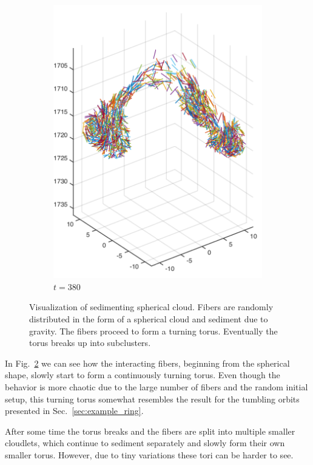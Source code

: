 \begin{figure}[htbp]
\begin{subfigure}[h]{0.45\textwidth}
    \includegraphics[width=\textwidth]{img/state_00380.pdf}
    \caption{$t=380$}\label{fig:sphere_simulation_1d}
  \end{subfigure}
  \caption[Visualization of sedimenting spherical cloud.]{Visualization of sedimenting spherical cloud. Fibers are randomly distributed in the form of a spherical cloud and sediment due to gravity. The fibers proceed to form a turning torus. Eventually the torus breaks up into subclusters.}
  \label{fig:sphere_simulation}
\end{figure}

In Fig.~\ref{fig:sphere_simulation} we can see how the interacting fibers, beginning from the spherical shape, slowly start to form a continuously turning torus. Even though the behavior is more chaotic due to the large number of fibers and the random initial setup, this turning torus somewhat resembles the result for the tumbling orbits presented in Sec.~\ref{sec:example_ring}.

After some time the torus breaks and the fibers are split into multiple smaller cloudlets, which continue to sediment separately and slowly form their own smaller torus. However, due to tiny variations these tori can be harder to see. 


